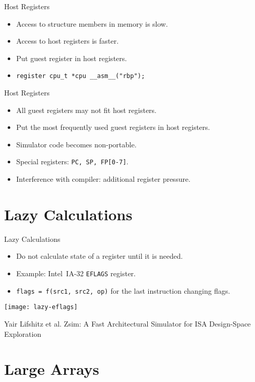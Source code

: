 \begin{frame}{Host Registers}
\begin{itemize}
\item Access to structure members in memory is slow.
\item Access to host registers is faster.
\item Put guest register in host registers.
\item \texttt{register cpu_t *cpu __asm__("rbp");}
\end{itemize}
\end{frame}

\begin{frame}{Host Registers}
\begin{itemize}
\item All guest registers may not fit host registers.
\item Put the most frequently used guest registers in host registers.
\item Simulator code becomes non-portable.
\item Special registers: \texttt{PC, SP, FP[0-7]}.
\item Interference with compiler: additional register pressure.
\end{itemize}
\end{frame}

\section{Lazy Calculations}

\begin{frame}{Lazy Calculations}
\begin{itemize}
\item Do not calculate state of a register until it is needed.
\item Example: Intel\reg~IA-32 \texttt{EFLAGS} register.
\item \texttt{flags = f(src1, src2, op)} for the last instruction changing flags.
\end{itemize}
\vfill
\centering
\texttt{[image: lazy-eflags]}

\tiny{Yair Lifshitz et al. Zsim: A Fast Architectural Simulator for ISA Design-Space Exploration}
\end{frame}

\section{Large Arrays}


